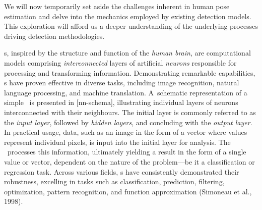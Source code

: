
We will now temporarily set aside the challenges inherent in human pose estimation and delve into the mechanics employed by existing detection models. This exploration will afford us a deeper understanding of the underlying processes driving detection methodologies.

\NN\-s, inspired by the structure and function of the {\em human brain}, are computational models comprising {\em interconnected} layers of artificial {\em neurons} responsible for processing and transforming information. Demonstrating remarkable capabilities, \NN\-s have proven effective in diverse tasks, including image recognition, natural language processing, and machine translation. A~schematic representation of a simple \NN\ is presented in [nn-schema], illustrating individual layers of neurons interconnected with their neighbours. The initial layer is commonly referred to as the {\em input layer}, followed by {\em hidden layers}, and concluding with the {\em output layer}. In practical usage, data, such as an image in the form of a vector where values represent individual pixels, is input into the initial layer for analysis. The \NN\ processes this information, ultimately yielding a result in the form of a single value or vector, dependent on the nature of the problem—be it a classification or regression task. Across various fields, \NN\-s have consistently demonstrated their robustness, excelling in tasks such as classification, prediction, filtering, optimization, pattern recognition, and function approximation (\scc Simoneau et al., 1998).


